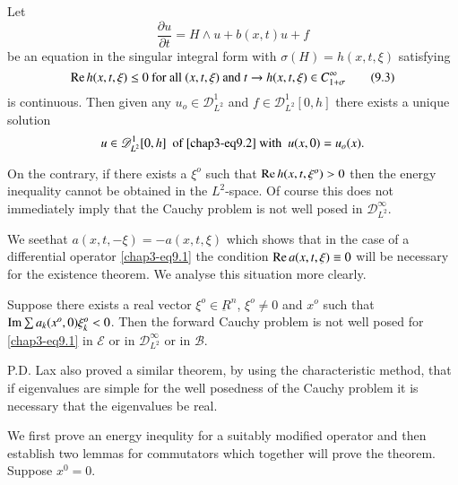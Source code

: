 \begin{proposition}\label{chap3-sec9-prop1} %
Let 
\begin{equation*}
\frac{\partial u}{\partial t} = H \wedge u + b(x, t) u + f
\tag{9.2} \label{chap3-eq9.2} 
\end{equation*}
be an equation in the singular integral form with $\sigma (H) = h (x,
t, \xi)$ satisfying 
\begin{equation*}
 \operatorname{Re} h(x,t,\xi ) \le 0 \text{ for all } (x, t, \xi ) \text{ and
} t \to h(x, t,\xi) \in C^\infty_{1 +  \sigma} \tag{9.3}\label{chap3-eq9.3} 
\end{equation*}
is continuous. Then given any $u_o \in \mathscr{D}^1_{L^2}$ and $f \in
\mathscr{D}^1_{L^2}[0, h]$ there exists a unique solution 
$$
u \in \mathscr{D}^1_{L^2}[0, h] \text{~ of  \eqref{chap3-eq9.2} with~ } u(x, 
0) = u_o(x). 
$$
 
 On the contrary, if there exists a $\xi^o$ such that $\operatorname{Re} h(x, t,
 \xi^o) > 0$ then the energy inequality cannot be obtained in the
 $L^2$-space. Of course this does not immediately imply that the
 Cauchy problem is not well posed in $\mathscr{D}^\infty_{L^2}$. 
 
 We see\pageoriginale that $a(x, t, - \xi)= - a(x, t, \xi)$ which
 shows that in the case of a differential operator \eqref{chap3-eq9.1} the
 condition $\operatorname{Re} a(x, t, \xi)  \equiv 0$ will be necessary for the
 existence theorem. We analyse  this situation more clearly.  
 \end{proposition}
 
\setcounter{theorem}{0}
\begin{theorem}\label{chap3-sec9-thm1} %
Suppose there exists a real vector $\xi^o \in \underbar{R}^n$, $\xi^o
\neq 0$ and $x^o$ such that $\operatorname{Im} \sum a_k (x^o, 0) \xi^o_k < 0$. Then
the forward Cauchy problem is not well posed for \eqref{chap3-eq9.1} in
$\mathscr{E}$ or in $\mathscr{D}^\infty_{L^2}$ or in $\mathscr{B}$.  
 \end{theorem} 

\begin{remark*}%
P.D. Lax \cite{key1} also proved a similar theorem, by using the
characteristic method, that if eigenvalues are simple for the well
posedness of the Cauchy problem it is necessary that the eigenvalues
be real. 
\end{remark*} 
 
 We first prove an energy inequlity for a suitably modified operator
 and then establish two lemmas for commutators which together will
 prove the theorem. Suppose $x^0 = 0$. 
 
